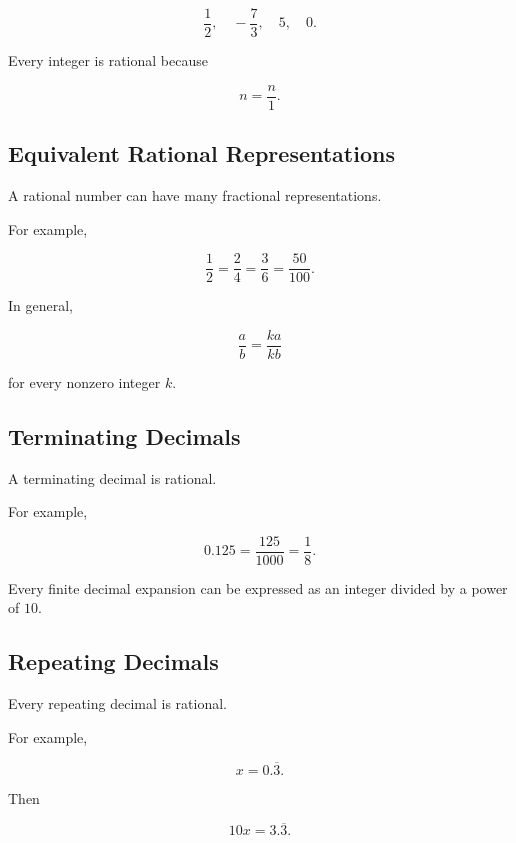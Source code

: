 \[
\boxed{
\frac12,
\quad
-\frac73,
\quad
5,
\quad
0.
}
\]

Every integer is rational because

\[
\boxed{
n
=
\frac{n}{1}.
}
\]

\subsection{Equivalent Rational Representations}
\label{subsec:equivalent-rational-representations}

A rational number can have many fractional representations.

For example,

\[
\boxed{
\frac12
=
\frac24
=
\frac36
=
\frac{50}{100}.
}
\]

In general,

\[
\boxed{
\frac{a}{b}
=
\frac{ka}{kb}
}
\]

for every nonzero integer \(k\).

\subsection{Terminating Decimals}
\label{subsec:terminating-decimals-reference}

A terminating decimal is rational.

For example,

\[
\boxed{
0.125
=
\frac{125}{1000}
=
\frac18.
}
\]

Every finite decimal expansion can be expressed as an integer divided by a
power of \(10\).

\subsection{Repeating Decimals}
\label{subsec:repeating-decimals-reference}

Every repeating decimal is rational.

For example,

\[
x
=
0.\overline{3}.
\]

Then

\[
10x
=
3.\overline{3}.
\]

